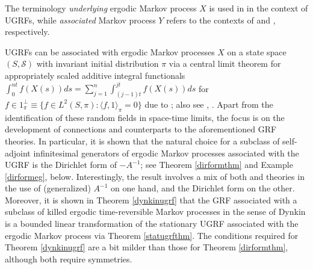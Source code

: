 \documentclass[11pt]{article}
\numberwithin{equation}{section}
\theoremstyle{definition}
\theoremstyle{remark}
\theoremstyle{definition}
\begin{document}
 \begin{remark}The terminology {\it underlying} ergodic Markov process $X$ is used in
in the context of UGRFs, while {\it associated} 
 Markov process $Y$ refers
to the contexts of \cite{Dynkin1} and \cite{DiaconisEvans},
respectively.
\end{remark}


UGRFs can be associated with ergodic 
Markov processes $X$ on a state space $(S,\mathcal{S})$ with invariant
initial distribution $\pi$
via a central limit theorem for appropriately 
scaled additive integral functionals
$\int_0^{nt}f(X(s))ds = \sum_{j=1}^n\int_{(j-1)t}^{jt}f(X(s))ds$  for $f\in1_\pi^\perp\equiv \{f\in L^2(S,\pi):\langle f,1\rangle_\pi=0\}$ due to 
\cite{RBfclt}; also see \cite{kipvar}, \cite{wayfclt}.  
Apart from the identification of these random fields in space-time limits,
the focus is on the development of connections and counterparts to the
aforementioned GRF  theories. In particular, it is shown that
 the natural choice for a
subclass of self-adjoint 
infinitesimal generators of ergodic Markov processes associated
with the UGRF
is the Dirichlet form of $-A^{-1}$; see
Theorem \ref{dirformthm} and Example \ref{dirformeg}, below. 
Interestingly, the result involves a mix
of  both \cite{Dynkin1} and \cite{DiaconisEvans} theories in the
use of (generalized) $A^{-1}$ on one hand, and the Dirichlet form
on the other. 
Moreover, it is shown in Theorem \ref{dynkinugrf} that the GRF associated with a subclass of killed ergodic time-reversible Markov processes in the sense of Dynkin  is a bounded
linear transformation of the stationary UGRF associated with the ergodic Markov process via Theorem \ref{statugrfthm}. 
The conditions required for Theorem \ref{dynkinugrf} are a bit milder than those
for Theorem \ref{dirformthm}, although both require symmetries. 
\end{document}
